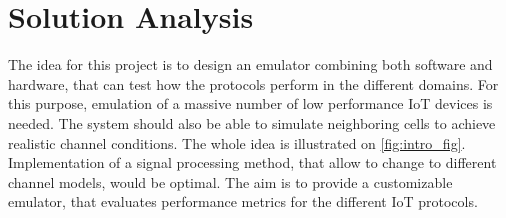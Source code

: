%


\section{Solution Analysis}



The idea for this project is to design an emulator combining both software and hardware, that can test how the protocols perform in the different domains. For this purpose, emulation of a massive number of low performance \gls{IoT} devices is needed. The system should also be able to simulate neighboring cells to achieve realistic channel conditions. The whole idea is illustrated on \autoref{fig:intro_fig}. Implementation of a signal processing method, that allow to change to different channel models, would be optimal. The aim is to provide a customizable emulator, that evaluates performance metrics for the different \gls{IoT} protocols. 

